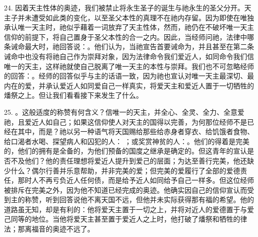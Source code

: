 24. 因着天主性体的奥迹，我们被禁止将永生圣子的诞生与祂永生的圣父分开。天主子并未遭受如此类的变化，以至圣父本性的真理不在祂内存留。因为即使在唯独承认唯一天主时，祂似乎藉着一词放弃了天主性体，然而，祂仍在不破坏唯一天主信仰的前提下，将自己置身于圣父本性的合一之内。因此，当经师问祂，法律中哪条诫命最大时，祂回答说：。他们认为，当祂宣告首要诫命为，并且甚至在第二条诫命中也没有将祂自己作为崇拜对象，因为法律命令我们爱近人，如同命令我们信唯一的天主，这样祂就使自己脱离了唯一天主的本性与崇拜。我们也不可忽略经师的回答：。经师的回答似乎与主的话语一致，因为祂也宣认对唯一天主最深切、最内在的爱，并承认爱近人如同爱自己一样真实，将爱天主和爱近人置于一切牺牲的燔祭之上。但让我们看看接下来发生了什么。\par

25. 。这般适度的称赞有何含义？信唯一的天主，并全心、全灵、全力、全意爱祂，且爱近人如自己；如果这信仰使人对天主的国得以完善，为何那位经师不是已经在其中，而是？祂以另一种语气将天国赐给那些给赤身者穿衣、给饥饿者食物、给口渴者水喝、探望病人和囚犯的人： ；或奖赏神贫的人：。他们的得着是完美的，他们的拥有是全备的，为他们预备的国度之继承是确定的。但这青年的宣认是否不及他们？他的责任理想将爱近人提升到爱己的层面；为达至善行完美，他还缺少什么？偶尔行善并乐意帮助，并非完美的爱；但完美的爱履行了全部的爱德责任，那时人不再亏负近人任何债，而是给予近人如同给予自己一样多。但这位经师被排斥在完美之外，因为他不知道已经完成的奥迹。他确实因自己的信仰宣认而受到主的称赞，听到回答说他不离天国不远，但他并未实际获得那有福的希望。他的道路虽无知，却是有利的：他将爱天主置于一切之上，并将对近人的爱德置于与爱己同等的地位。当他将爱天主甚至置于爱近人之上时，他打破了燔祭和牺牲的律法；那离福音的奥迹不远了。\par

